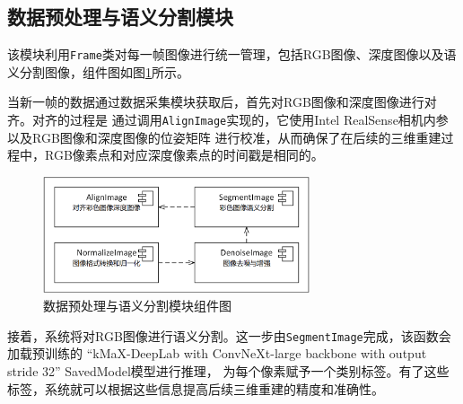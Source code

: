\subsection{数据预处理与语义分割模块}
\par 该模块利用\texttt{Frame}类对每一帧图像进行统一管理，包括RGB图像、深度图像以及语义分割图像，组件图如图\ref{fig:component3}所示。

\par 当新一帧的数据通过数据采集模块获取后，首先对RGB图像和深度图像进行对齐。对齐的过程是
通过调用\texttt{AlignImage}实现的，它使用Intel RealSense相机内参以及RGB图像和深度图像的位姿矩阵
进行校准，从而确保了在后续的三维重建过程中，RGB像素点和对应深度像素点的时间戳是相同的。

\begin{figure}[htbp]
	\centering
	\includegraphics[width=0.7\textwidth]{figures/uml/component3.png}
	\caption{数据预处理与语义分割模块组件图}
	\label{fig:component3}
\end{figure}

\par 接着，系统将对RGB图像进行语义分割。这一步由\texttt{SegmentImage}完成，该函数会加载预训练的
“kMaX-DeepLab with ConvNeXt-large backbone with output stride 32” SavedModel模型进行推理，
为每个像素赋予一个类别标签。有了这些标签，系统就可以根据这些信息提高后续三维重建的精度和准确性。





